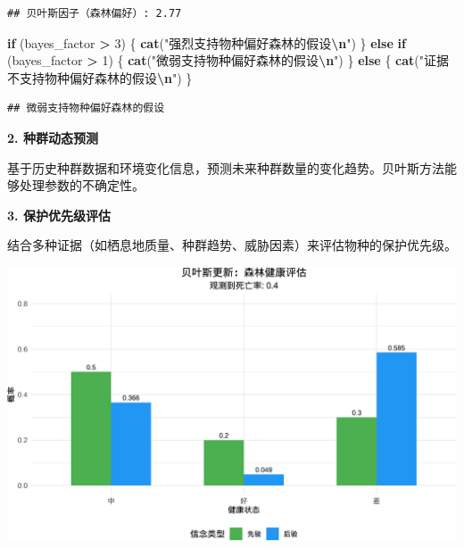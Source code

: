 \documentclass[
]{book}
\newenvironment{Shaded}{\begin{snugshade}}{\end{snugshade}}
\newcommand{\ControlFlowTok}[1]{\textcolor[rgb]{0.13,0.29,0.53}{\textbf{#1}}}
\newcommand{\DecValTok}[1]{\textcolor[rgb]{0.00,0.00,0.81}{#1}}
\newcommand{\FunctionTok}[1]{\textcolor[rgb]{0.13,0.29,0.53}{\textbf{#1}}}
\newcommand{\NormalTok}[1]{#1}
\newcommand{\SpecialCharTok}[1]{\textcolor[rgb]{0.81,0.36,0.00}{\textbf{#1}}}
\newcommand{\StringTok}[1]{\textcolor[rgb]{0.31,0.60,0.02}{#1}}
\begin{document}
\begin{verbatim}
## 贝叶斯因子（森林偏好）: 2.77
\end{verbatim}

\begin{Shaded}
\begin{Highlighting}[]
\ControlFlowTok{if}\NormalTok{ (bayes\_factor }\SpecialCharTok{\textgreater{}} \DecValTok{3}\NormalTok{) \{}
  \FunctionTok{cat}\NormalTok{(}\StringTok{"强烈支持物种偏好森林的假设}\SpecialCharTok{\textbackslash{}n}\StringTok{"}\NormalTok{)}
\NormalTok{\} }\ControlFlowTok{else} \ControlFlowTok{if}\NormalTok{ (bayes\_factor }\SpecialCharTok{\textgreater{}} \DecValTok{1}\NormalTok{) \{}
  \FunctionTok{cat}\NormalTok{(}\StringTok{"微弱支持物种偏好森林的假设}\SpecialCharTok{\textbackslash{}n}\StringTok{"}\NormalTok{)}
\NormalTok{\} }\ControlFlowTok{else}\NormalTok{ \{}
  \FunctionTok{cat}\NormalTok{(}\StringTok{"证据不支持物种偏好森林的假设}\SpecialCharTok{\textbackslash{}n}\StringTok{"}\NormalTok{)}
\NormalTok{\}}
\end{Highlighting}
\end{Shaded}

\begin{verbatim}
## 微弱支持物种偏好森林的假设
\end{verbatim}

\textbf{2. 种群动态预测}

基于历史种群数据和环境变化信息，预测未来种群数量的变化趋势。贝叶斯方法能够处理参数的不确定性。

\textbf{3. 保护优先级评估}

结合多种证据（如栖息地质量、种群趋势、威胁因素）来评估物种的保护优先级。

\begin{center}\includegraphics[width=0.8\linewidth]{ecological-statistics_files/figure-latex/unnamed-chunk-10-1} \end{center}
\end{document}
